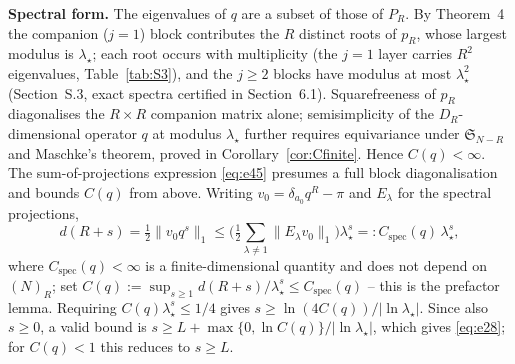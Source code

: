 \documentclass[twoside,11pt]{article}
\begin{document}
\textbf{Spectral form.} The eigenvalues of $q$ are a subset of those of
$P_R$. By Theorem~4 the companion ($j=1$) block contributes the $R$ distinct
roots of $p_R$, whose largest modulus is $\lambda_\star$; each root occurs
with multiplicity (the $j=1$ layer carries $R^2$ eigenvalues,
Table~\ref{tab:S3}), and the $j\geq2$ blocks have modulus at most
$\lambda_\star^2$ (Section~S.3, exact spectra certified in Section~6.1).
Squarefreeness of $p_R$ diagonalises the $R\times R$ companion matrix alone;
semisimplicity of the $D_R$-dimensional operator $q$ at modulus
$\lambda_\star$ further requires equivariance under $\mathfrak{S}_{N-R}$ and Maschke's
theorem, proved in Corollary~\ref{cor:Cfinite}. Hence $C(q)<\infty$. The sum-of-projections
expression \eqref{eq:e45} presumes a full block diagonalisation and bounds
$C(q)$ from above. Writing
$v_0=\delta_{a_0}q^{R}-\pi$ and $E_\lambda$ for the spectral projections,
\begin{equation}\label{eq:e45}
d(R+s)=\tfrac12\big\|v_0q^{s}\big\|_{1} \leq\Big(\tfrac12\sum_{\lambda\neq1}\|E_\lambda v_0\|_{1}\Big) \lambda_\star^{s} =:C_{\mathrm{spec}}(q)\,\lambda_\star^{s},
\end{equation}
where $C_{\mathrm{spec}}(q)<\infty$ is a finite-dimensional quantity and does not depend on $(N)_R$; set $C(q):=\sup_{s\geq1}d(R+s)/\lambda_\star^s\le C_{\mathrm{spec}}(q)$ -- this is the prefactor lemma. Requiring
$C(q)\lambda_\star^{s}\leq1/4$ gives
$s\geq\ln(4C(q))/|\ln\lambda_\star|$. Since also $s\geq0$, a valid bound is $s\geq L+\max\{0,\ln C(q)\}/|\ln\lambda_\star|$, which gives \eqref{eq:e28}; for $C(q)<1$ this reduces to $s\geq L$.
\end{document}
